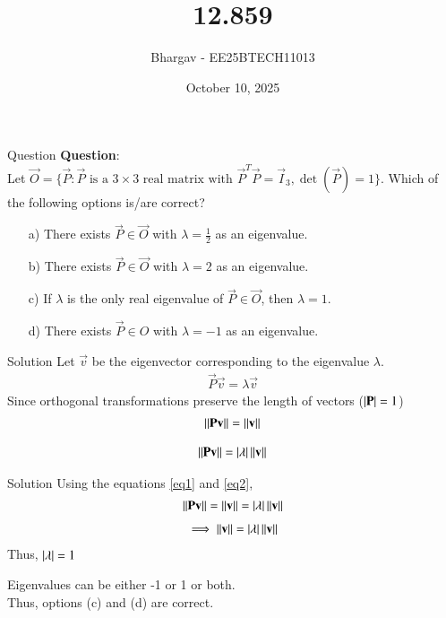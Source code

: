 \documentclass{beamer}
\title{12.859}
\date{October 10, 2025}
\author{Bhargav - EE25BTECH11013}
\begin{document}
\frame{\titlepage}

\begin{frame}{Question}
\textbf{Question}: \\
Let $\vec{O} = \{\vec{P} : \vec{P} \text{ is a } 3 \times 3 \text{ real matrix with } \vec{P}^T\vec{P} = \vec{I}_3, \det(\vec{P}) = 1\}$. Which of the following options is/are correct?

\begin{enumerate}
    \item[a)] There exists $\vec{P} \in \vec{O}$ with $\lambda = \frac{1}{2}$ as an eigenvalue.
    \item[b)] There exists $\vec{P} \in \vec{O}$ with $\lambda = 2$ as an eigenvalue.
    \item[c)] If $\lambda$ is the only real eigenvalue of $\vec{P} \in 
    \vec{O}$, then $\lambda = 1$.
    \item[d)] There exists $\vec{P} \in O$ with $\lambda = -1$ as an eigenvalue.
\end{enumerate}
\end{frame}

\begin{frame}{Solution}
Let $\vec{v}$ be the eigenvector corresponding to the eigenvalue $\lambda$.
\begin{align}
\vec{P}\vec{v} = \lambda\vec{v}
\end{align}
Since orthogonal transformations preserve the length of vectors  ($\left\vert\mathbf{P}\right\vert = 1$)
\begin{align}
\left\lVert\mathbf{P}\mathbf{v}\right\rVert=\left\lVert\mathbf{v}\right\rVert \label{eq1}
\end{align}

\begin{align}
\left\lVert\mathbf{P}\mathbf{v}\right\rVert = \left\vert\lambda\right\vert\left\lVert\mathbf{v}\right\rVert \label{eq2}
\end{align}

\end{frame}

\begin{frame}{Solution}
Using the equations \eqref{eq1} and \eqref{eq2},
\begin{align}
\left\lVert\mathbf{P}\mathbf{v}\right\rVert = \left\lVert\mathbf{v}\right\rVert = \left\vert\lambda\right\vert\left\lVert\mathbf{v}\right\rVert
\end{align}
\begin{align}
\implies \left\lVert\mathbf{v}\right\rVert = \left\vert\lambda\right\vert\left\lVert\mathbf{v}\right\rVert
\end{align}
Thus, $\left\vert\lambda\right\vert = 1$

Eigenvalues can be either -1 or 1 or both. \\

Thus, options (c) and (d) are correct. \\ \\ \\
\end{frame}
\end{document}
